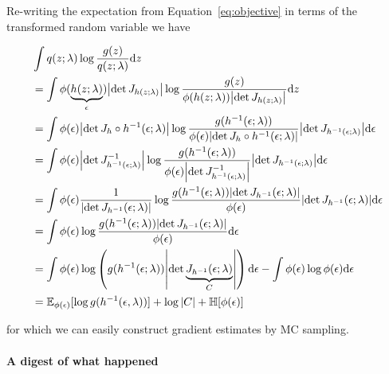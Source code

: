 \documentclass[11pt]{article}
\begin{document}
Re-writing the expectation from Equation~\eqref{eq:objective} in terms of the transformed random variable we have
\begin{small}
\begin{subequations}
\begin{align}
& \int q(z;\lambda) \log \dfrac{g(z)}{q(z;\lambda)} \dd z \\
&= \int \phi(\underbrace{h(z; \lambda)}_{\epsilon}) \abs{\det J_{h(z; \lambda)}} \log \frac{g(z)}{\phi(h(z; \lambda)) \abs{\det J_{h(z; \lambda)}}} \dd z \label{eq:change-density}\\
&= \int \phi(\epsilon) \abs{\det J_{h} \circ h^{-1}(\epsilon; \lambda)} \log \frac{g(h^{-1}(\epsilon; \lambda))}{\phi(\epsilon) \abs{\det J_{h} \circ h^{-1}(\epsilon; \lambda)}} \abs{\det J_{h^{-1}(\epsilon; \lambda)}} \dd \epsilon \label{eq:change-variable} \\
&= \int \phi(\epsilon) \abs{\det J^{-1}_{h^{-1}(\epsilon; \lambda)}} \log \frac{g(h^{-1}(\epsilon; \lambda))}{\phi(\epsilon) \abs{\det J^{-1}_{h^{-1}(\epsilon; \lambda)}}} \abs{\det J_{h^{-1}(\epsilon; \lambda)}} \dd \epsilon \label{eq:inverse-theorem} \\
&= \int \phi(\epsilon) \frac{1}{\abs{\det J_{h^{-1}}(\epsilon; \lambda)}} \log \frac{g(h^{-1}(\epsilon; \lambda))\abs{\det J_{h^{-1}}(\epsilon; \lambda)}}{\phi(\epsilon)} \abs{\det J_{h^{-1}}(\epsilon; \lambda)} \dd \epsilon \label{eq:det} \\
&= \int \phi(\epsilon) \log \frac{g(h^{-1}(\epsilon; \lambda))\abs{\det J_{h^{-1}}(\epsilon; \lambda)}}{\phi(\epsilon)} \dd \epsilon \label{eq:cancel}\\
&= \int \phi(\epsilon) \log \left(g(h^{-1}(\epsilon; \lambda))\abs{\det \underbrace{J_{h^{-1}}(\epsilon; \lambda)}_{C}}\right) \dd \epsilon  - \int \phi(\epsilon) \log \phi(\epsilon) \dd \epsilon \label{eq:scale} \\
&= \mathbb E_{\phi(\epsilon)}[\log g(h^{-1}(\epsilon, \lambda))] + \log \abs{C} + \mathbb H[\phi(\epsilon)]
\end{align}
\end{subequations}
\end{small}
for which we can easily construct gradient estimates by MC sampling.

\paragraph{A digest of what happened} 
\end{document}
